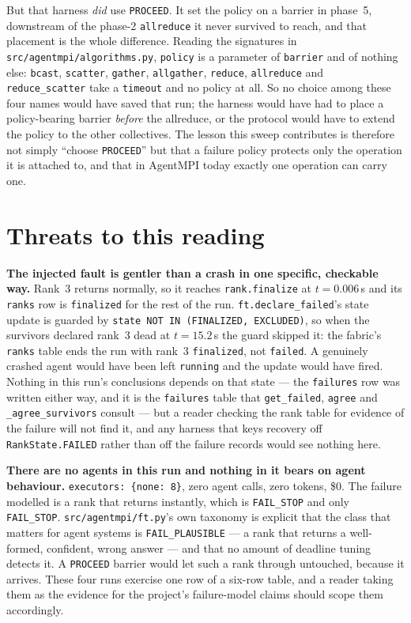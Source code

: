 \documentclass[11pt]{article}
\begin{document}
But that harness \emph{did} use \texttt{PROCEED}. It set the policy on a barrier in
phase~5, downstream of the phase-2 \texttt{allreduce} it never survived to reach, and
that placement is the whole difference. Reading the signatures in
\texttt{src/agentmpi/algorithms.py}, \texttt{policy} is a parameter of \texttt{barrier}
and of nothing else: \texttt{bcast}, \texttt{scatter}, \texttt{gather},
\texttt{allgather}, \texttt{reduce}, \texttt{allreduce} and \texttt{reduce\_scatter} take
a \texttt{timeout} and no policy at all. So no choice among these four names would have
saved that run; the harness would have had to place a policy-bearing barrier
\emph{before} the allreduce, or the protocol would have to extend the policy to the other
collectives. The lesson this sweep contributes is therefore not simply ``choose
\texttt{PROCEED}'' but that a failure policy protects only the operation it is attached
to, and that in AgentMPI today exactly one operation can carry one.

\section{Threats to this reading}

\textbf{The injected fault is gentler than a crash in one specific, checkable way.} Rank~3
returns normally, so it reaches \texttt{rank.finalize} at $t=0.006$\,s and its
\texttt{ranks} row is \texttt{finalized} for the rest of the run.
\texttt{ft.declare\_failed}'s state update is guarded by
\texttt{state NOT IN (FINALIZED, EXCLUDED)}, so when the survivors declared rank~3 dead
at $t=15.2$\,s the guard skipped it: the fabric's \texttt{ranks} table ends the run with
rank~3 \texttt{finalized}, not \texttt{failed}. A genuinely crashed agent would have been
left \texttt{running} and the update would have fired. Nothing in this run's conclusions
depends on that state --- the \texttt{failures} row was written either way, and it is the
\texttt{failures} table that \texttt{get\_failed}, \texttt{agree} and
\texttt{\_agree\_survivors} consult --- but a reader checking the rank table for evidence
of the failure will not find it, and any harness that keys recovery off
\texttt{RankState.FAILED} rather than off the failure records would see nothing here.

\textbf{There are no agents in this run and nothing in it bears on agent behaviour.}
\texttt{executors: \{none: 8\}}, zero agent calls, zero tokens, \$0. The failure modelled
is a rank that returns instantly, which is \texttt{FAIL\_STOP} and only
\texttt{FAIL\_STOP}. \texttt{src/agentmpi/ft.py}'s own taxonomy is explicit that the class
that matters for agent systems is \texttt{FAIL\_PLAUSIBLE} --- a rank that returns a
well-formed, confident, wrong answer --- and that no amount of deadline tuning detects it.
A \texttt{PROCEED} barrier would let such a rank through untouched, because it arrives.
These four runs exercise one row of a six-row table, and a reader taking them as the
evidence for the project's failure-model claims should scope them accordingly.
\end{document}
